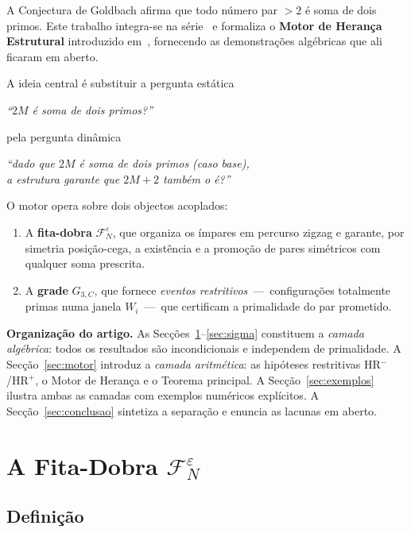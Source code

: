 \documentclass[12pt, a4paper]{article}
\theoremstyle{plain}
\theoremstyle{definition}
\theoremstyle{remark}
\begin{document}
	A Conjectura de Goldbach afirma que todo número par $>2$ é soma de
	dois primos.  Este trabalho integra-se na
	série~\cite{grade,invariante,peso,problemaB} e formaliza o
	\textbf{Motor de Herança Estrutural} introduzido em~\cite{motor},
	fornecendo as demonstrações algébricas que ali ficaram em aberto.
	
	A ideia central é substituir a pergunta estática
	\begin{center}
		\emph{``$2M$ é soma de dois primos?''}
	\end{center}
	pela pergunta dinâmica
	\begin{center}
		\emph{``dado que $2M$ é soma de dois primos (caso base),\\
			a estrutura garante que $2M+2$ também o é?''}
	\end{center}
	
	O motor opera sobre dois objectos acoplados:
	\begin{enumerate}
		\item A \textbf{fita-dobra} $\mathcal{F}_N^\varepsilon$, que
		organiza os ímpares em percurso zigzag e garante, por
		simetria posição-cega, a existência e a promoção de pares
		simétricos com qualquer soma prescrita.
		\item A \textbf{grade} $G_{3,C}$, que fornece \emph{eventos
			restritivos}~---~configurações totalmente primas numa janela
		$W_i$~---~que certificam a primalidade do par prometido.
	\end{enumerate}
	
	\medskip
	\noindent\textbf{Organização do artigo.}
	As Secções~\ref{sec:fita}--\ref{sec:sigma} constituem a
	\emph{camada algébrica}: todos os resultados são incondicionais e
	independem de primalidade.
	A Secção~\ref{sec:motor} introduz a \emph{camada aritmética}: as
	hipóteses restritivas HR$^-$/HR$^+$, o Motor de Herança e o Teorema
	principal.
	A Secção~\ref{sec:exemplos} ilustra ambas as camadas com exemplos
	numéricos explícitos.
	A Secção~\ref{sec:conclusao} sintetiza a separação e enuncia as
	lacunas em aberto.
	
	\section{A Fita-Dobra $\mathcal{F}_N^\varepsilon$}
	\label{sec:fita}
	
	\subsection{Definição}
	
\end{document}
